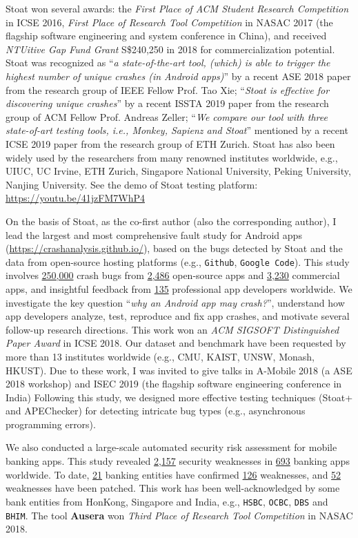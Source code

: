 \documentclass[a4paper]{article}
\begin{document}
Stoat won several awards: the \emph{First Place of ACM Student Research Competition} in ICSE 2016, \emph{First Place of Research Tool Competition} in NASAC 2017 (the flagship software engineering and system conference in China), and received \emph{NTUitive Gap Fund Grant} S\$240,250 in 2018 for commercialization potential. Stoat was recognized as ``\emph{a state-of-the-art tool, (which) is able to trigger the highest number of unique crashes (in Android apps)}'' by a recent ASE 2018 paper from the research group of IEEE Fellow Prof. Tao Xie; ``\emph{Stoat is effective for discovering unique crashes}'' by a recent ISSTA 2019 paper from the research group of ACM Fellow Prof. Andreas Zeller; ``\emph{We compare our tool with three state-of-art testing tools, i.e., Monkey, Sapienz and Stoat}'' mentioned by a recent ICSE 2019 paper from the research group of ETH Zurich.
Stoat has also been widely used by the researchers from many renowned institutes worldwide, e.g., UIUC, UC Irvine, ETH Zurich, Singapore National University, Peking University, Nanjing University. See the demo of Stoat testing platform: \url{https://youtu.be/41jzFM7WhP4}

On the basis of Stoat, as the co-first author (also the corresponding author), I lead the largest and most comprehensive fault study for Android apps (\url{https://crashanalysis.github.io/}), based on the bugs detected by Stoat and the data from open-source hosting platforms (e.g., \texttt{Github}, \texttt{Google Code}). This study involves \underline{250,000} crash bugs from \underline{2,486} open-source apps and \underline{3,230} commercial apps, and insightful feedback from \underline{135} professional app developers worldwide. We investigate the key question ``\emph{why an Android app may crash?}'', understand how app developers analyze, test, reproduce and fix app crashes, and motivate several follow-up research directions. This work won an \emph{ACM SIGSOFT Distinguished Paper Award} in ICSE 2018. Our dataset and benchmark have been requested by more than 13 institutes worldwide (e.g., CMU, KAIST, UNSW, Monash, HKUST). Due to these work, I was invited to give talks in A-Mobile 2018 (a ASE 2018 workshop) and ISEC 2019 (the flagship software engineering conference in India)
Following this study, we designed more effective testing techniques (Stoat+ and APEChecker) for detecting intricate bug types (e.g., asynchronous programming errors). 

We also conducted a large-scale automated security risk assessment for mobile banking apps. This study revealed \underline{2,157} security weaknesses in \underline{693} banking apps worldwide. To date, \underline{21} banking entities have confirmed \underline{126} weaknesses, and \underline{52} weaknesses have been patched. This work has been well-acknowledged by some bank entities from HonKong, Singapore and India, e.g., \texttt{HSBC}, \texttt{OCBC}, \texttt{DBS} and \texttt{BHIM}. The tool \textbf{Ausera} won \emph{Third Place of Research Tool Competition} in NASAC 2018.%
\end{document}
